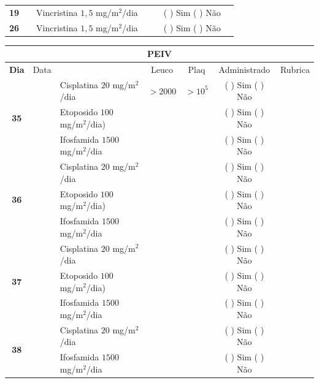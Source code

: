 \documentclass[11pt,a4paper,oldfontcommands]{memoir}
\begin{document}
\begin{center}
\begin{table}[H]
\begin{tabular}{p{1cm}c|p{4cm}|p{2cm}p{2cm}|c|c}
    \cline{1-3}\cline{6-6}
    \multicolumn{1}{c|}{\textbf{19}}&&{Vincristina \(1,5\) mg/m\(^2\)/dia}&\multicolumn{1}{c}{}&&{(  ) Sim (  ) Não}&\\
    \cline{1-3}\cline{6-6}
    \multicolumn{1}{c|}{\textbf{26}}&&{Vincristina \(1,5\) mg/m\(^2\)/dia}&\multicolumn{1}{c}{}&&{(  ) Sim (  ) Não}&\\
    \hline
\end{tabular}
\end{table}
\begin{table}[H] \small
\begin{tabular}{p{1cm}c|p{4cm}|p{2cm}p{2cm}|c|c}
	\hline
	\multicolumn{7}{c}{PEIV} \\
	\hline
	\multicolumn{1}{c|}{\multirow{1}{*}{\textbf{Dia}}}&{Data}&{}&\multicolumn{1}{c|}{Leuco}&\multicolumn{1}{c|}{Plaq}&{Administrado}&{Rubrica} \\
    \hline
    \multicolumn{1}{c|}{\multirow{3}{*}{\textbf{35}}}&\multirow{3}{*}{}&{Cisplatina \(20\) mg/m\(^2\)/dia}&\multicolumn{1}{c|}{\(>2000\)}&\multicolumn{1}{c|}{\(>10^5\)}&{(  ) Sim (  ) Não}&\\
    \cline{4-5}
    \multicolumn{1}{c|}{}&&{Etoposido \(100\) mg/m\(^2\)/dia)}&\multicolumn{1}{c|}{}&&{(  ) Sim (  ) Não}&\\
    \multicolumn{1}{c|}{}&&{Ifosfamida \(1500\) mg/m\(^2\)/dia}&\multicolumn{1}{c|}{}&&{(  ) Sim (  ) Não}&\\
    \cline{2-6}
    \multicolumn{1}{c|}{\multirow{3}{*}{\textbf{36}}}&\multirow{3}{*}{}&{Cisplatina \(20\) mg/m\(^2\)/dia}&{}&&{(  ) Sim (  ) Não}&\\
    \multicolumn{1}{c|}{}&&{Etoposido \(100\) mg/m\(^2\)/dia)}&&&{(  ) Sim (  ) Não}&\\
    \multicolumn{1}{c|}{}&&{Ifosfamida \(1500\) mg/m\(^2\)/dia}&&&{(  ) Sim (  ) Não}&\\
    \cline{2-3}\cline{6-6}
    \multicolumn{1}{c|}{\multirow{3}{*}{\textbf{37}}}&\multirow{3}{*}{}&{Cisplatina \(20\) mg/m\(^2\)/dia}&{}&&{(  ) Sim (  ) Não}&\\
    \multicolumn{1}{c|}{}&&{Etoposido \(100\) mg/m\(^2\)/dia)}&&&{(  ) Sim (  ) Não}&\\
    \multicolumn{1}{c|}{}&&{Ifosfamida \(1500\) mg/m\(^2\)/dia}&&&{(  ) Sim (  ) Não}&\\
    \cline{2-3}\cline{6-6}
    \multicolumn{1}{c|}{\multirow{2}{*}{{\textbf{38}}}}&\multirow{2}{*}{}&{Cisplatina \(20\) mg/m\(^2\)/dia}&{}&&{(  ) Sim (  ) Não}&\\
    \multicolumn{1}{c|}{}&&{Ifosfamida \(1500\) mg/m\(^2\)/dia}&&&{(  ) Sim (  ) Não}&\\

\end{tabular}
\end{table}
\end{center}
\end{document}
